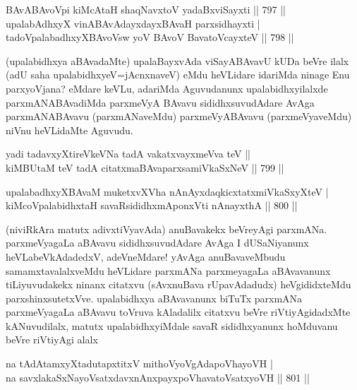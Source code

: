 \begin{shl}
BAvABAvoV\s pi kiMcAtaH shaqNavxtoV yadaBxviSayxti \hfill||  797 ||  \\
upalabAdhxyX vinA\s BAvAdayxdayxBAvaH parxsidhayxti | \\
tadoVpalabadhxyXBAvoV\s sw yoV BAvoV BavatoVcayxteV \hfill||  798 ||  
\end{shl}

\begin{artha}
(upalabidhxya aBAvadaMte) upalaBayxvAda viSayABAvavU kUDa beVre ilalx (adU saha upalabidhxyeV=jAcnxnaveV) eMdu heVLidare idariMda ninage Enu parxyoVjana? eMdare keVLu, adariMda Aguvudanunx upalabidhxyilalxde parxmANABAvadiMda parxmeVyA BAvavu sididhxsuvudAdare AvAga parxmANABAvavu (parxmANaveMdu) parxmeVyABAvavu (parxmeVyaveMdu) niVnu heVLidaMte Aguvudu.
\end{artha}

\begin{shl}
yadi tadavxyXtireVkeVNa tadA vakatxvayxmeVva teV ||  \\
kiMBUtaM teV tadA citatxmaBAvaparxsamiVkaSxNeV \hfill ||  799 ||  
\end{shl}
				
\begin{shl}
upalabadhxyXBAvaM muketxvXVha nAnAyxdaqkicxtatxmiVkaSxyXteV | \\
kiMcoVpalabidhxtaH savaRsididhxmAponxVti nAnayxthA \hfill||  800 ||  
\end{shl}

\begin{artha}
(niviRkAra matutx adivxtiVyavAda) anuBavakekx beVreyAgi parxmANa. parxmeVyagaLa aBAvavu sididhxsuvudAdare AvAga I dUSaNiyanunx heVLabeVkAdadedxV, adeVneMdare! yAvAga anuBavaveMbudu samamxtavalalxveMdu heVLidare parxmANa parxmeyagaLa aBAvavanunx tiLiyuvudakekx ninanx citatxvu (sAvxnuBava rUpavAdadudx) heVgididxteMdu parxshinxsutetxVve. upalabidhxya aBAvavanunx biTuTx parxmANa parxmeVyagaLa aBAvavu toVruva kAladalilx citatxvu beVre riVtiyAgidadxMte kANuvudilalx, matutx upalabidhxyiMdale savaR sididhxyanunx hoMduvanu beVre riVtiyAgi alalx
\end{artha}


\begin{shl}
na tAdAtamxyXtadutapxtitxV mithoV\s yoVgAdapoVhayoVH | \\
na savxlakaSxNayoVsatxdavxnAnxpayxpoVhavatoVsatxyoVH \hfill||  801 ||  
\end{shl}

